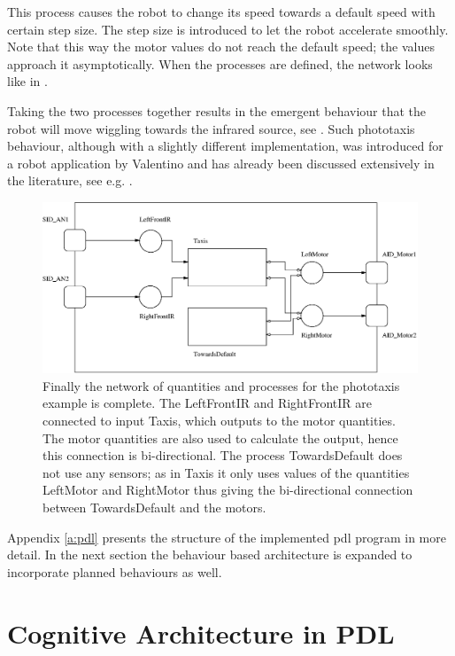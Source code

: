 This process causes the robot to change its speed towards a default speed with certain step size. The step size is introduced to let the robot accelerate smoothly. Note that this way the motor values do not reach the default speed; the values approach it asymptotically. When the processes are defined, the network looks like in .

Taking the two processes together results in the emergent behaviour that the robot will move wiggling towards the infrared source, see . Such phototaxis behaviour, although with a slightly different implementation, was introduced for a robot application by Valentino \citet{braitenberg:1984} and has already been discussed extensively in the literature, see e.g. \citealt{steels:1994}.

\begin{figure}
\centerline{\includegraphics[width=12cm]{robots//pdl_network.eps}}
\caption{Finally the network of quantities and processes for the phototaxis example is complete. The LeftFrontIR and RightFrontIR are connected to input Taxis, which outputs to the motor quantities. The motor quantities are also used to calculate the output, hence this connection is bi-directional. The process TowardsDefault does not use any sensors; as in Taxis it only uses values of the quantities LeftMotor and RightMotor thus giving the bi-directional connection between TowardsDefault and the motors.}
\label{f:robots:pdl}
\end{figure}

Appendix \ref{a:pdl} presents the structure of the implemented {\sc pdl} program in more detail. In the next section the behaviour based architecture is expanded to incorporate planned behaviours as well.


\section{Cognitive Architecture in PDL}\label{s:robots:architecture}
	
